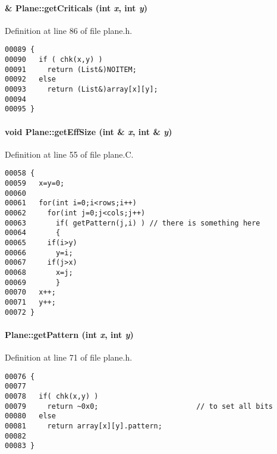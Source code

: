 \paragraph{ \& Plane::get\-Criticals (int {\em x}, int {\em y})\hspace{0.3cm}{\tt  [inline]}}\hfill



Definition at line 86 of file plane.h.\small\begin{verbatim}00089 {
00090   if ( chk(x,y) )
00091     return (List&)NOITEM;
00092   else
00093     return (List&)array[x][y];
00094 
00095 }
\end{verbatim}\normalsize 
\label{Plane_a5}
\paragraph{\setlength{\rightskip}{0pt plus 5cm}void Plane::get\-Eff\-Size (int \& {\em x}, int \& {\em y})}\hfill



Definition at line 55 of file plane.C.\small\begin{verbatim}00058 {
00059   x=y=0;
00060 
00061   for(int i=0;i<rows;i++)
00062     for(int j=0;j<cols;j++)
00063       if( getPattern(j,i) ) // there is something here
00064       {
00065     if(i>y)
00066       y=i;
00067     if(j>x)
00068       x=j;
00069       }
00070   x++;
00071   y++;
00072 }
\end{verbatim}\normalsize 
\label{Plane_a2}
\paragraph{ Plane::get\-Pattern (int {\em x}, int {\em y})\hspace{0.3cm}{\tt  [inline]}}\hfill



Definition at line 71 of file plane.h.\small\begin{verbatim}00076 {
00077 
00078   if( chk(x,y) )
00079     return ~0x0;                       // to set all bits
00080   else
00081     return array[x][y].pattern;
00082 
00083 }
\end{verbatim}\normalsize 
\label{Plane_a4}

